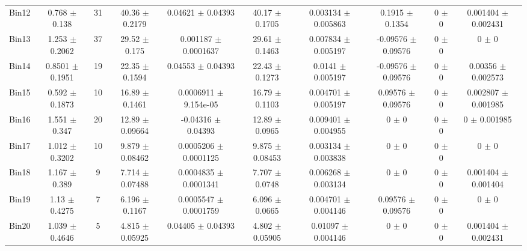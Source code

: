 \begin{tabular}{@{\extracolsep{4pt}}lccccccccc@{}}
     Bin12 & 0.768 $\pm$ 0.138 & 31 & 40.36 $\pm$ 0.2179 & 0.04621 $\pm$ 0.04393 & 40.17 $\pm$ 0.1705 & 0.003134 $\pm$ 0.005863 & 0.1915 $\pm$ 0.1354 & 0 $\pm$ 0 & 0.001404 $\pm$ 0.002431 \\ 
     Bin13 & 1.253 $\pm$ 0.2062 & 37 & 29.52 $\pm$ 0.175 & 0.001187 $\pm$ 0.0001637 & 29.61 $\pm$ 0.1463 & 0.007834 $\pm$ 0.005197 & -0.09576 $\pm$ 0.09576 & 0 $\pm$ 0 & 0 $\pm$ 0 \\ 
     Bin14 & 0.8501 $\pm$ 0.1951 & 19 & 22.35 $\pm$ 0.1594 & 0.04553 $\pm$ 0.04393 & 22.43 $\pm$ 0.1273 & 0.0141 $\pm$ 0.005197 & -0.09576 $\pm$ 0.09576 & 0 $\pm$ 0 & 0.00356 $\pm$ 0.002573 \\ 
     Bin15 & 0.592 $\pm$ 0.1873 & 10 & 16.89 $\pm$ 0.1461 & 0.0006911 $\pm$ 9.154e-05 & 16.79 $\pm$ 0.1103 & 0.004701 $\pm$ 0.005197 & 0.09576 $\pm$ 0.09576 & 0 $\pm$ 0 & 0.002807 $\pm$ 0.001985 \\ 
     Bin16 & 1.551 $\pm$ 0.347 & 20 & 12.89 $\pm$ 0.09664 & -0.04316 $\pm$ 0.04393 & 12.89 $\pm$ 0.0965 & 0.009401 $\pm$ 0.004955 & 0 $\pm$ 0 & 0 $\pm$ 0 & 0 $\pm$ 0.001985 \\ 
     Bin17 & 1.012 $\pm$ 0.3202 & 10 & 9.879 $\pm$ 0.08462 & 0.0005206 $\pm$ 0.0001125 & 9.875 $\pm$ 0.08453 & 0.003134 $\pm$ 0.003838 & 0 $\pm$ 0 & 0 $\pm$ 0 & 0 $\pm$ 0 \\ 
     Bin18 & 1.167 $\pm$ 0.389 & 9 & 7.714 $\pm$ 0.07488 & 0.0004835 $\pm$ 0.0001341 & 7.707 $\pm$ 0.0748 & 0.006268 $\pm$ 0.003134 & 0 $\pm$ 0 & 0 $\pm$ 0 & 0.001404 $\pm$ 0.001404 \\ 
     Bin19 & 1.13 $\pm$ 0.4275 & 7 & 6.196 $\pm$ 0.1167 & 0.0005547 $\pm$ 0.0001759 & 6.096 $\pm$ 0.0665 & 0.004701 $\pm$ 0.004146 & 0.09576 $\pm$ 0.09576 & 0 $\pm$ 0 & 0 $\pm$ 0 \\ 
     Bin20 & 1.039 $\pm$ 0.4646 & 5 & 4.815 $\pm$ 0.05925 & 0.04405 $\pm$ 0.04393 & 4.802 $\pm$ 0.05905 & 0.01097 $\pm$ 0.004146 & 0 $\pm$ 0 & 0 $\pm$ 0 & 0.001404 $\pm$ 0.002431 \\ 
\hline\hline
  \end{tabular}
